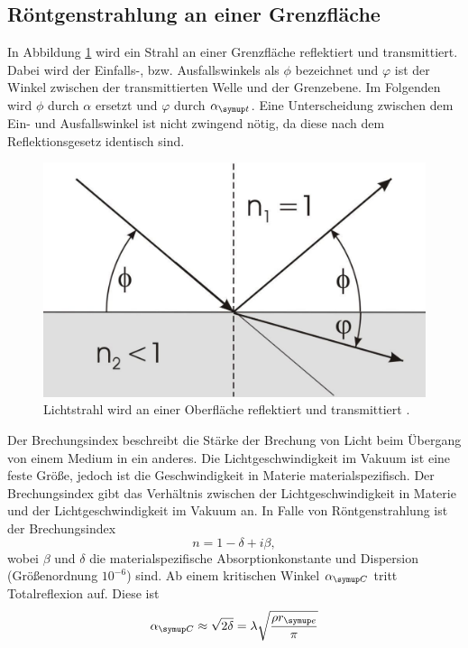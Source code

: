 \subsection{Röntgenstrahlung an einer Grenzfläche}
In Abbildung \ref{fig:reflection_transmission} wird ein Strahl an einer Grenzfläche reflektiert und transmittiert. Dabei 
wird der Einfalls-, bzw. Ausfallswinkels als $\phi$ bezeichnet und $\varphi$ ist der Winkel zwischen der transmittierten Welle und der Grenzebene.
Im Folgenden wird $\phi$ durch $\alpha$ ersetzt und $\varphi$ durch $\alpha\idx{t}$. Eine Unterscheidung zwischen dem Ein- und Ausfallswinkel ist 
nicht zwingend nötig, da diese nach dem Reflektionsgesetz identisch sind.
\begin{figure}[H]
  \centering
  \includegraphics[scale=0.25]{rt.pdf}
  \caption{Lichtstrahl wird an einer Oberfläche reflektiert und transmittiert \cite{uni_giessen}.}
  \label{fig:reflection_transmission}
\end{figure} 
\noindent
Der Brechungsindex beschreibt die Stärke der Brechung von Licht
beim Übergang von einem Medium in ein anderes. Die Lichtgeschwindigkeit im Vakuum
ist eine feste Größe, jedoch ist die Geschwindigkeit in Materie materialspezifisch. Der
Brechungsindex gibt das Verhältnis zwischen der Lichtgeschwindigkeit in Materie und
der Lichtgeschwindigkeit im Vakuum an.
In Falle von Röntgenstrahlung ist der Brechungsindex
\begin{equation}
  n= 1 - \delta + i \beta , 
\end{equation}
wobei $\beta$ und $\delta$ die materialspezifische Absorptionkonstante und Dispersion (Größenordnung $10^{-6}$) sind.
Ab einem kritischen Winkel $\alpha\idx{C}$ tritt Totalreflexion auf. Diese ist 
\begin{equation}
  \alpha\idx{C} \approx \sqrt{2 \delta} = \lambda \sqrt{\frac{\rho r\idx{e}}{\pi}}
  \label{eq:kritisch}
\end{equation}
